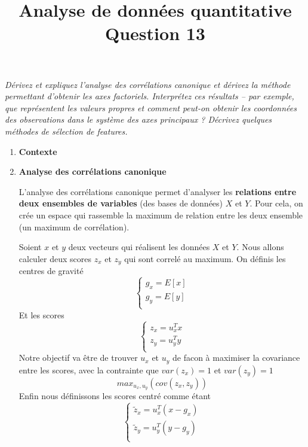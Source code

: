 \documentclass[a4paper, 11pt, onecolumn]{article}
\title{Analyse de données quantitative\\Question 13}
\date{}
\begin{document}
\maketitle

\textit{Dérivez et expliquez l’analyse des corrélations canonique et dérivez la méthode permettant d’obtenir les axes factoriels. Interprétez ces résultats – par exemple, que représentent les valeurs propres et comment peut-on obtenir les coordonnées des observations dans le système des axes principaux ? Décrivez quelques méthodes de sélection de features.}

\begin{enumerate}

\item \textbf{Contexte}

\item \textbf{Analyse des corrélations canonique}

  L'analyse des corrélations canonique permet d'analyser les \textbf{relations entre deux ensembles de variables} (des bases de données) $X$ et $Y$. 
  Pour cela, on crée un espace qui rassemble la maximum de relation entre les deux ensemble (un maximum de corrélation).

Soient $x$ et $y$ deux vecteurs qui réalisent les données $X$ et $Y$. Nous allons calculer deux scores $z_x$ et $z_y$ qui sont correlé au maximum. On définis les centres de gravité
$$
\left\{
\begin{array}{l}
g_x=E[x]\\
g_y=E[y]\\
\end{array}
\right.
$$
Et les scores
$$
\left\{
\begin{array}{l}
z_x=u_x^Tx\\
z_y=u_y^Ty\\
\end{array}
\right.
$$
Notre objectif va être de trouver $u_x$ et $u_y$ de facon à maximiser la covariance entre les scores, avec la contrainte que $var(z_x)=1$ et $var(z_y)=1$
$$max_{u_x,u_y}(cov(z_x,z_y))$$
Enfin nous définissons les scores centré comme étant
$$
\left\{
\begin{array}{l}
\tilde z_x=u_x^T(x-g_x)\\
\tilde z_y=u_y^T(y-g_y)\\
\end{array}
\right.
$$


\end{enumerate}
\end{document}
